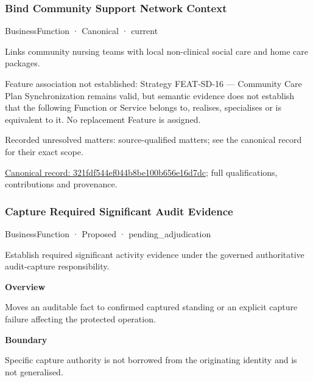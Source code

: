 \subsubsection{Bind Community Support Network Context}

\label{element:321fdf544ef044b8be100b656e16d7dc}
{\small BusinessFunction · Canonical · current}\par

Links community nursing teams with local non-clinical social care and home care packages.



Feature association not established: Strategy FEAT-SD-16 — Community Care Plan Synchronization remains valid, but semantic evidence does not establish that the following Function or Service belongs to, realises, specialises or is equivalent to it. No replacement Feature is assigned.


{\small Recorded unresolved matters: source-qualified matters; see the canonical record for their exact scope.}\par
{\footnotesize \href{../../../../continuum/business/business-function/321fdf544ef044b8be100b656e16d7dc.md}{Canonical record: 321fdf544ef044b8be100b656e16d7dc}; full qualifications, contributions and provenance.}\par
\subsubsection{Capture Required Significant Audit Evidence}

\label{element:c8e614257cf14bd1878df894455f21fb}
{\small BusinessFunction · Proposed · pending\_adjudication}\par

Establish required significant activity evidence under the governed authoritative audit-capture responsibility.



\textbf{Overview}



Moves an auditable fact to confirmed captured standing or an explicit capture failure affecting the protected operation.



\textbf{Boundary}



Specific capture authority is not borrowed from the originating identity and is not generalised.


